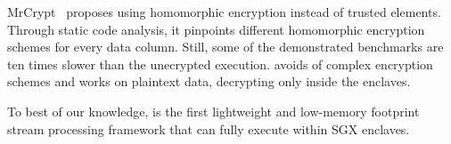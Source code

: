 MrCrypt \cite{tetali2013mrcrypt} proposes using homomorphic encryption instead of trusted elements. Through static code analysis, it pinpoints different homomorphic encryption schemes for every data column. Still, some of the demonstrated benchmarks are ten times slower than the unecrypted execution. \SYS{} avoids of complex encryption schemes and works on plaintext data, decrypting only inside the enclaves.

To best of our knowledge, \SYS{} is the first lightweight and low-memory footprint stream processing framework that can fully execute within SGX enclaves.
